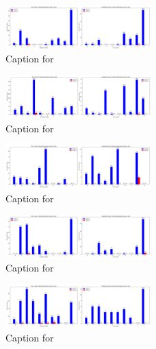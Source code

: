 \documentclass[12pt, a4paper]{article}
\begin{document}
\begin{figure}[ht]
\centering
\includegraphics[width=0.5\textwidth]{combined_class_boundary_pgd/combined_class_4_misclassifications_eps_0.04.png}
\caption{Caption for }
\label{fig:combined_class_4_misclassifications_eps_0.04.png}
\end{figure}

\begin{figure}[ht]
\centering
\includegraphics[width=0.5\textwidth]{combined_class_boundary_pgd/combined_class_5_misclassifications_eps_0.04.png}
\caption{Caption for }
\label{fig:combined_class_5_misclassifications_eps_0.04.png}
\end{figure}

\begin{figure}[ht]
\centering
\includegraphics[width=0.5\textwidth]{combined_class_boundary_pgd/combined_class_6_misclassifications_eps_0.04.png}
\caption{Caption for }
\label{fig:combined_class_6_misclassifications_eps_0.04.png}
\end{figure}

\begin{figure}[ht]
\centering
\includegraphics[width=0.5\textwidth]{combined_class_boundary_pgd/combined_class_7_misclassifications_eps_0.04.png}
\caption{Caption for }
\label{fig:combined_class_7_misclassifications_eps_0.04.png}
\end{figure}

\begin{figure}[ht]
\centering
\includegraphics[width=0.5\textwidth]{combined_class_boundary_pgd/combined_class_8_misclassifications_eps_0.04.png}
\caption{Caption for }
\label{fig:combined_class_8_misclassifications_eps_0.04.png}
\end{figure}
\end{document}

